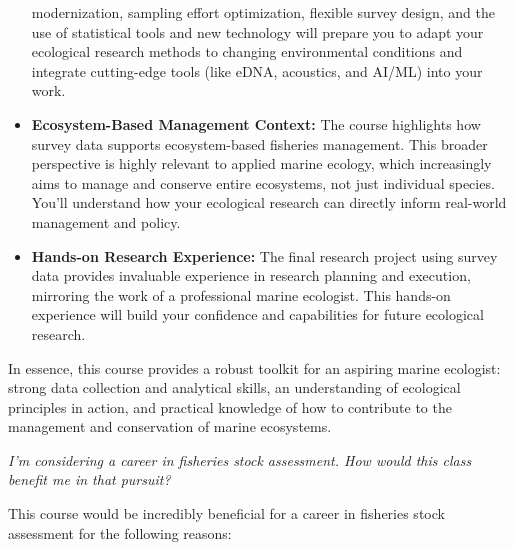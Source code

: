 \documentclass[
  letterpaper,
  oneside,
  open=any]{scrbook}
\begin{document}
\begin{itemize}
  modernization, sampling effort optimization, flexible survey design,
  and the use of statistical tools and new technology will prepare you
  to adapt your ecological research methods to changing environmental
  conditions and integrate cutting-edge tools (like eDNA, acoustics, and
  AI/ML) into your work.
\item
  \textbf{Ecosystem-Based Management Context:} The course highlights how
  survey data supports ecosystem-based fisheries management. This
  broader perspective is highly relevant to applied marine ecology,
  which increasingly aims to manage and conserve entire ecosystems, not
  just individual species. You'll understand how your ecological
  research can directly inform real-world management and policy.
\item
  \textbf{Hands-on Research Experience:} The final research project
  using survey data provides invaluable experience in research planning
  and execution, mirroring the work of a professional marine ecologist.
  This hands-on experience will build your confidence and capabilities
  for future ecological research.
\end{itemize}

In essence, this course provides a robust toolkit for an aspiring marine
ecologist: strong data collection and analytical skills, an
understanding of ecological principles in action, and practical
knowledge of how to contribute to the management and conservation of
marine ecosystems.

\emph{I'm considering a career in fisheries stock assessment. How would
this class benefit me in that pursuit?}

This course would be incredibly beneficial for a career in fisheries
stock assessment for the following reasons:
\end{document}
